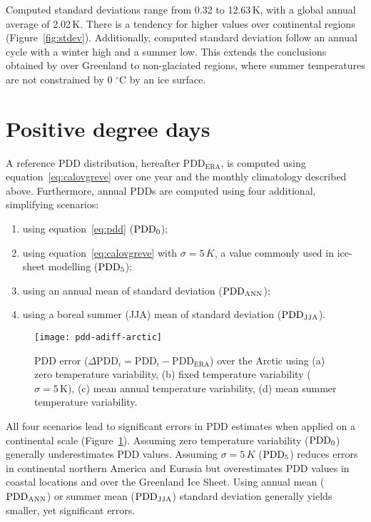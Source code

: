 \documentclass[review]{igs}
\begin{document}
Computed standard deviations range from 0.32 to 12.63\,K, with a global annual average of 2.02\,K. There is a tendency for higher values over continental regions (Figure~\ref{fig:stdev}). Additionally, computed standard deviation follow an annual cycle with a winter high and a summer low. This extends the conclusions obtained by \citet{fausto-etal-2011} over Greenland to non-glaciated regions, where summer temperatures are not constrained by 0 $^\circ$C by an ice surface.


\section{Positive degree days}

A reference PDD distribution, hereafter $\mathrm{PDD_{ERA}}$, is computed using equation~\ref{eq:calovgreve} over one year and the monthly climatology described above. Furthermore, annual PDDs are computed using four additional, simplifying scenarios:

\begin{enumerate}
  \item using equation~\ref{eq:pdd} ($\rm PDD_0$);
  \item using equation~\ref{eq:calovgreve} with $\sigma=5\,K$, a value commonly used in ice-sheet modelling \citep{huybrechts-dewolde-1999,seddik-etal-2012,charbit-etal-2013} ($\rm PDD_5$);
  \item using an annual mean of standard deviation ($\rm PDD_{ANN}$);
  \item using a boreal summer (JJA) mean of standard deviation ($\rm PDD_{JJA}$).
\end{enumerate}

\begin{figure}
  \centering\texttt{[image: pdd-adiff-arctic]}
  \caption{PDD error ($\Delta\mathrm{PDD}_i = \mathrm{PDD}_i - \mathrm{PDD_{ERA}}$) over the Arctic using (a) zero temperature variability, (b) fixed temperature variability ($\sigma=5\,\mathrm{K}$), (c) mean annual temperature variability, (d) mean summer temperature variability.}
  \label{fig:pdd}
\end{figure}

All four scenarios lead to significant errors in PDD estimates when applied on a continental scale (Figure~\ref{fig:pdd}). Assuming zero temperature variability ($\rm PDD_0$) generally underestimates PDD values. Assuming $\sigma=5\,K$ ($\rm PDD_5$) reduces errors in continental northern America and Eurasia but overestimates PDD values in coastal locations and over the Greenland Ice Sheet. Using annual mean ($\rm PDD_{ANN}$) or summer mean ($\rm PDD_{JJA}$) standard deviation generally yields smaller, yet significant errors.
\end{document}
